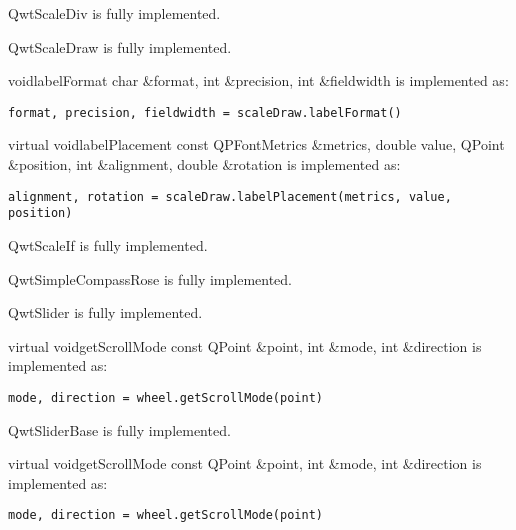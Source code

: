 \documentclass{manual}
\begin{document}
\begin{classdesc*}{QwtScaleDiv}
  is fully implemented.
\end{classdesc*}

\begin{classdesc*}{QwtScaleDraw}
  is fully implemented.

  \begin{cfuncdesc}{void}{labelFormat}{
      char \&format, int \&precision, int \&fieldwidth}
    is implemented as:
    \begin{verbatim}
format, precision, fieldwidth = scaleDraw.labelFormat()
    \end{verbatim}    
  \end{cfuncdesc}

  \begin{cfuncdesc}{virtual void}{labelPlacement}{
      const QPFontMetrics \&metrics, double value, QPoint \&position,
      int \&alignment, double \&rotation}
    is implemented as:
    \begin{verbatim}
alignment, rotation = scaleDraw.labelPlacement(metrics, value, position)
    \end{verbatim}    
  \end{cfuncdesc}

\end{classdesc*}

\begin{classdesc*}{QwtScaleIf}
  is fully implemented.
\end{classdesc*}

\begin{classdesc*}{QwtSimpleCompassRose}
  is fully implemented.
\end{classdesc*}

\begin{classdesc*}{QwtSlider}
  is fully implemented.

  \begin{cfuncdesc}{virtual void}{getScrollMode}{
      const QPoint \&point, int \&mode, int \&direction}
    is implemented as:
    \begin{verbatim}
mode, direction = wheel.getScrollMode(point)
    \end{verbatim}    
  \end{cfuncdesc}

\end{classdesc*}

\begin{classdesc*}{QwtSliderBase}
  is fully implemented.

  \begin{cfuncdesc}{virtual void}{getScrollMode}{
      const QPoint \&point, int \&mode, int \&direction}
    is implemented as:
    \begin{verbatim}
mode, direction = wheel.getScrollMode(point)
    \end{verbatim}    
  \end{cfuncdesc}

\end{classdesc*}
\end{document}
